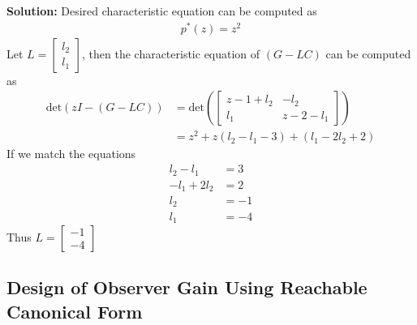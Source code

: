 \documentclass[twoside]{article}
\begin{document}
\textbf{Solution:} Desired characteristic equation can be computed as
%
\begin{align*}
  p^*(z) = z^2
\end{align*}
%
Let $L = \left[ \begin{array}{c} l_2 \\ l_1 \end{array} \right]$, then
the characteristic equation of $(G - L C)$ can be computed as
%
\begin{align*}
  \mathrm{det} \left( z I - ( G - L C ) \right) &= 
  \mathrm{det} \left(
  \left[ \begin{array}{cc} z - 1 + l_2 & -l_2 \\ l_1 & z - 2 - l_1 \end{array} \right]
  \right)
\\
&= z^2 + z (l_2 - l_1 - 3) + (l_1 - 2 l_2 + 2)
\end{align*}
%
If we match the equations
%
\begin{align*}
  l_2 - l_1 &= 3
\\
  -l_1 + 2 l_2 &= 2
\\
 l_2 &= -1
\\
 l_1 &= -4
\end{align*}
%
Thus $L = \left[ \begin{array}{c} -1 \\ -4 \end{array} \right]$

\subsection*{Design of Observer Gain Using Reachable Canonical
Form}
\end{document}
